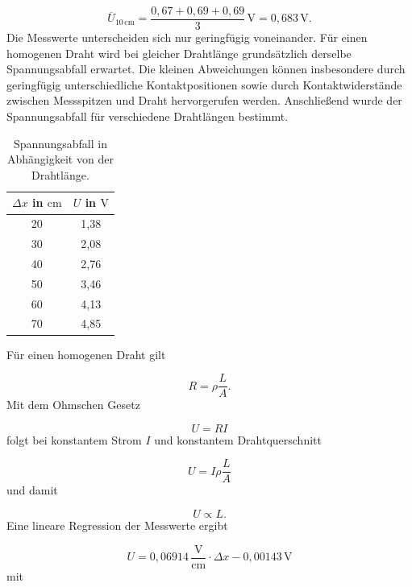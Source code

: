\documentclass{report}
\begin{document}
\begin{equation}
\overline{U}_{10\,\mathrm{cm}}
=
\frac{0{,}67+0{,}69+0{,}69}{3}\,\mathrm{V}
=
0{,}683\,\mathrm{V}.
\end{equation}
\noindent
Die Messwerte unterscheiden sich nur geringfügig voneinander. Für einen
homogenen Draht wird bei gleicher Drahtlänge grundsätzlich derselbe
Spannungsabfall erwartet. Die kleinen Abweichungen können insbesondere durch
geringfügig unterschiedliche Kontaktpositionen sowie durch Kontaktwiderstände
zwischen Messspitzen und Draht hervorgerufen werden.
\noindent
Anschließend wurde der Spannungsabfall für verschiedene Drahtlängen bestimmt.

\begin{table}[htbp]
    \centering
    \caption{Spannungsabfall in Abhängigkeit von der Drahtlänge.}
    \label{tab:draht_laenge}
    \begin{tabular}{c|c}
        \hline
        $\Delta x$ in $\mathrm{cm}$ & $U$ in $\mathrm{V}$\\
        \hline
        20 & 1{,}38\\
        30 & 2{,}08\\
        40 & 2{,}76\\
        50 & 3{,}46\\
        60 & 4{,}13\\
        70 & 4{,}85\\
        \hline
    \end{tabular}
\end{table}
\noindent
Für einen homogenen Draht gilt

\begin{equation}
R=\rho\frac{L}{A}.
\end{equation}
\noindent
Mit dem Ohmschen Gesetz

\begin{equation}
U=RI
\end{equation}
\noindent
folgt bei konstantem Strom $I$ und konstantem Drahtquerschnitt

\begin{equation}
U
=
I\rho\frac{L}{A}
\end{equation}
\noindent
und damit

\begin{equation}
\boxed{U\propto L}.
\end{equation}
\noindent
Eine lineare Regression der Messwerte ergibt

\begin{equation}
U
=
0{,}06914\,\frac{\mathrm{V}}{\mathrm{cm}}
\cdot\Delta x
-
0{,}00143\,\mathrm{V}
\end{equation}
\noindent
mit
\end{document}
